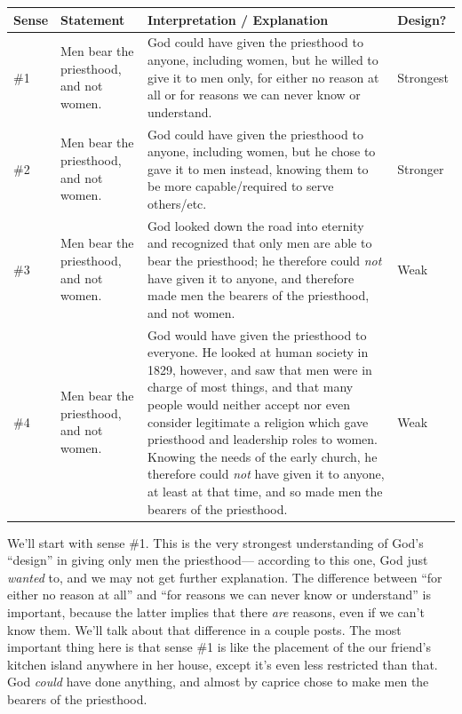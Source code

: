 		\begin{table}[H]
		\centering
		\begin{tabular}{p{1cm}p{4cm}p{9cm}p{1cm}}
		\textbf{Sense} & \textbf{Statement} & \textbf{Interpretation / Explanation} & \textbf{Design?} \\ \hline
		\#1 & Men bear the priesthood, and not women. & God could have given the priesthood to anyone, including women, but he willed to give it to men only, for either no reason at all or for reasons we can never know or understand. & Strongest \\ \hline
		\#2 & Men bear the priesthood, and not women. & God could have given the priesthood to anyone, including women, but he chose to gave it to men instead, knowing them to be more capable/required to serve others/etc. & Stronger \\ \hline
		\#3 & Men bear the priesthood, and not women. & God looked down the road into eternity and recognized that only men are able to bear the priesthood; he therefore could \textit{not} have given it to anyone, and therefore made men the bearers of the priesthood, and not women. & Weak \\ \hline
		\#4 & Men bear the priesthood, and not women. & God would have given the priesthood to everyone. He looked at human society in 1829, however, and saw that men were in charge of most things, and that many people would neither accept nor even consider legitimate a religion which gave priesthood and leadership roles to women. Knowing the needs of the early church, he therefore could \textit{not} have given it to anyone, at least at that time, and so made men the bearers of the priesthood. & Weak \\
		\end{tabular}
		\end{table}
		
		We'll start with sense \#1.
		This is the very strongest understanding of God's ``design'' in giving only men the priesthood---%
			according to this one,
				God just \textit{wanted} to,
					and we may not get further explanation.
		The difference between ``for either no reason at all'' and ``for reasons we can never know or understand'' is important,
			because the latter implies that there \textit{are} reasons,
				even if we can't know them.
		We'll talk about that difference in a couple posts.
		The most important thing here is that sense \#1 is like the placement of the our friend's kitchen island anywhere in her house,
			except it's even less restricted than that.
		God \textit{could} have done anything,
			and almost by caprice chose to make men the bearers of the priesthood.
			
